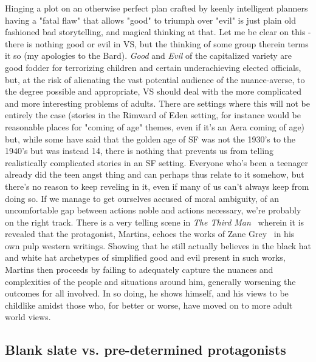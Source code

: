Hinging a plot on an otherwise perfect plan crafted by keenly
intelligent planners having a "fatal flaw" that allows "good" to
triumph over "evil" is just plain old fashioned bad storytelling, and
magical thinking at that. Let me be clear on this - there is nothing
good or evil in VS, but the thinking of some group therein terms it so
(my apologies to the Bard).  \emph{Good} and \emph{Evil} of the
capitalized variety are good fodder for terrorizing children and
certain underachieving elected officials, but, at the risk of
alienating the vast potential audience of the nuance-averse, to the
degree possible and appropriate, VS should deal with the more
complicated and more interesting problems of adults. There are
settings where this will not be entirely the case (stories in the
Rimward of Eden setting, for instance would be reasonable places for
"coming of age" themes, even if it's an Aera coming of age) but, while
some have said that the golden age of SF was not the 1930's to the
1940's but was instead 14, there is nothing that prevents us from
telling realistically complicated stories in an SF setting. Everyone
who's been a teenager already did the teen angst thing and can perhaps
thus relate to it somehow, but there's no reason to keep reveling in
it, even if many of us can't always keep from doing so. If we manage
to get ourselves accused of moral ambiguity, of an uncomfortable gap
between actions noble and actions necessary, we're probably on the
right track. There is a very telling scene in \emph{The Third
Man}~\cite{ThirdMan} wherein it is revealed that the protagonist,
Martins, echoes the works of Zane Grey~\cite{ZaneGrey} in his own pulp
western writings. Showing that he still actually believes in the black
hat and white hat archetypes of simplified good and evil present in
such works, Martins then proceeds by failing to adequately capture the
nuances and complexities of the people and situations around him,
generally worsening the outcomes for all involved. In so doing, he
shows himself, and his views to be childlike amidst those who, for
better or worse, have moved on to more adult world views.

\subsection{Blank slate vs. pre-determined protagonists}

